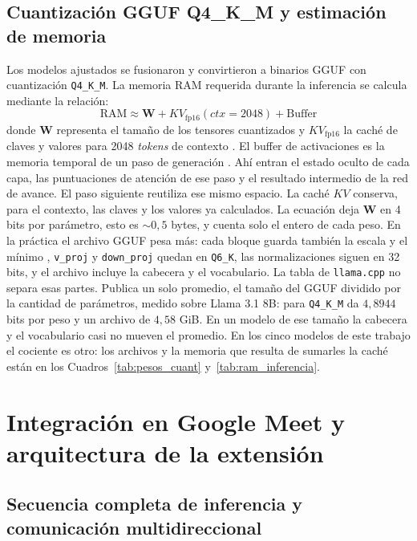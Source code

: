 \subsection{Cuantización GGUF Q4\_K\_M y estimación de memoria}
Los modelos ajustados se fusionaron y convirtieron a binarios GGUF con cuantización \texttt{Q4\_K\_M}. La memoria RAM requerida durante la inferencia se calcula mediante la relación:
\begin{equation}
\text{RAM} \approx \mathbf{W} + KV_{\text{fp16}}(ctx=2048) + \text{Buffer}
\label{eq:ram_runtime}
\end{equation}
donde $\mathbf{W}$ representa el tamaño de los tensores cuantizados y $KV_{\text{fp16}}$ la caché de claves y valores para 2048 \textit{tokens} de contexto \cite{kwon2023vllm}. El buffer de activaciones es la memoria temporal de un paso de generación \cite{korthikanti2023reducing}. Ahí entran el estado oculto de cada capa, las puntuaciones de atención de ese paso y el resultado intermedio de la red de avance. El paso siguiente reutiliza ese mismo espacio. La caché $KV$ conserva, para el contexto, las claves y los valores ya calculados. La ecuación deja $\mathbf{W}$ en 4 bits por parámetro, esto es $\sim 0{,}5$ bytes, y cuenta solo el entero de cada peso. En la práctica el archivo GGUF pesa más: cada bloque guarda también la escala y el mínimo \cite{ggml2023kquants}, \texttt{v\_proj} y \texttt{down\_proj} quedan en \texttt{Q6\_K}, las normalizaciones siguen en 32 bits, y el archivo incluye la cabecera y el vocabulario. La tabla de \texttt{llama.cpp} no separa esas partes. Publica un solo promedio, el tamaño del GGUF dividido por la cantidad de parámetros, medido sobre Llama 3.1 8B: para \texttt{Q4\_K\_M} da $4{,}8944$ bits por peso y un archivo de $4{,}58$ GiB. En un modelo de ese tamaño la cabecera y el vocabulario casi no mueven el promedio. En los cinco modelos de este trabajo el cociente es otro: los archivos y la memoria que resulta de sumarles la caché están en los Cuadros~\ref{tab:pesos_cuant} y~\ref{tab:ram_inferencia}.

\section{Integración en Google Meet y arquitectura de la extensión}

\subsection{Secuencia completa de inferencia y comunicación multidireccional}

